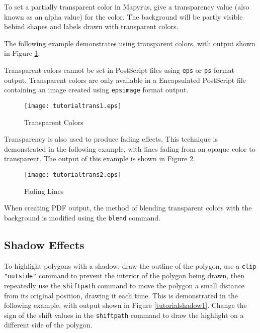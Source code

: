 To set a partially transparent color in Mapyrus, give a
transparency value (also known as an alpha value) for the color.
The background will be partly visible behind shapes and labels
drawn with transparent colors.

The following example demonstrates using transparent colors, with
output shown in Figure \ref{tutorialtrans1}.

Transparent colors cannot be set in PostScript files using
\texttt{eps} or \texttt{ps}
format output.
Transparent colors are only available in a Encapsulated PostScript file
containing an image created using
\texttt{epsimage}
format output.



\begin{figure}[htb]
\texttt{[image: tutorialtrans1.eps]}
\caption{Transparent Colors}
\label{tutorialtrans1}
\end{figure}

Transparency is also used to produce fading effects.
This technique is demonstrated in the following example, with
lines fading from an opaque color to transparent.
The output of this example is shown in Figure \ref{tutorialtrans2}.



\begin{figure}[htb]
\texttt{[image: tutorialtrans2.eps]}
\caption{Fading Lines}
\label{tutorialtrans2}
\end{figure}

When creating PDF output, the method of blending transparent colors
with the background is modified using the
\texttt{blend} command.

\subsection{Shadow Effects}
\label{tutorialshadow}

To highlight polygons with a shadow, draw the outline of the polygon, use a
\texttt{clip "outside"}
command to prevent the interior of the polygon being drawn,
then repeatedly use the \texttt{shiftpath} command to move the polygon a small
distance from its original position, drawing it each time.  This is
demonstrated in the following example, with output shown in Figure
\ref{tutorialshadow1}.  Change the sign of the shift values in the
\texttt{shiftpath} command to draw the highlight on a different side of the
polygon.



